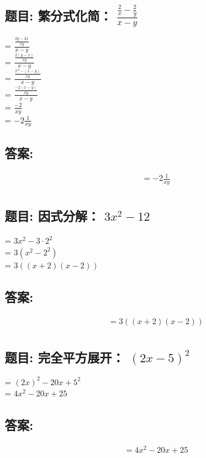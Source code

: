 \documentclass[12pt]{article}
\begin{document}
\subsection*{题目: 繁分式化简： $\frac{\frac{2}{x}-\frac{2}{y}}{x-y}$}
= $\frac{\frac{2y-2x}{xy}}{x-y}$\\
= $\frac{\frac{2(y-x)}{xy}}{x-y}$\\
= $\frac{\frac{2 *-(x-y)}{xy}}{x-y}$\\
= $\frac{\frac{-2(x-y)}{xy}}{x-y}$\\
= $\frac{-2}{xy}$\\
= $-2\frac{1}{xy}$\\
\subsection*{答案:}
\begin{align*}
  &= -2\frac{1}{xy} \\
\end{align*}

\subsection*{题目: 因式分解： $3x^{2}-12$}
= $3x^{2} - 3\cdot2^{2}$\\
= $3(x^{2} - 2^{2})$\\
= $3((x+2)(x-2))$\\
\subsection*{答案:}
\begin{align*}
  &= 3((x+2)(x-2)) \\
\end{align*}

\subsection*{题目: 完全平方展开： $(2x - 5)^{2}$}
= $(2x)^{2} - 20x + 5^{2}$\\
= $4x^{2} - 20x + 25$\\
\subsection*{答案:}
\begin{align*}
  &= 4x^{2} - 20x + 25 \\
\end{align*}
\end{document}
